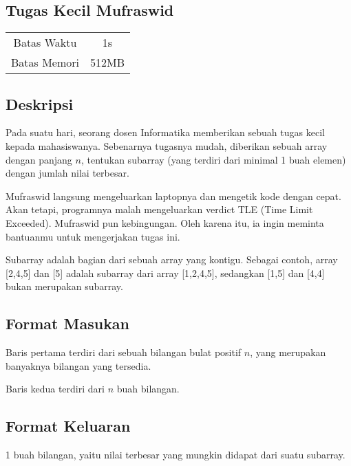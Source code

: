 \documentclass{article}
\begin{document}
\begin{center}
    \section*{Tugas Kecil Mufraswid} %

    \begin{tabular}{ | c c | }
        \hline
        Batas Waktu  & 1s \\    %
        Batas Memori & 512MB \\  %
        \hline
    \end{tabular}
\end{center}

\subsection*{Deskripsi}

Pada suatu hari, seorang dosen Informatika memberikan sebuah tugas kecil kepada mahasiswanya. Sebenarnya tugasnya mudah, diberikan sebuah array dengan panjang $n$, tentukan subarray (yang terdiri dari minimal 1 buah elemen) dengan jumlah nilai terbesar.
\par
Mufraswid langsung mengeluarkan laptopnya dan mengetik kode dengan cepat. Akan tetapi, programnya malah mengeluarkan verdict TLE (Time Limit Exceeded). Mufraswid pun kebingungan. Oleh karena itu, ia ingin meminta bantuanmu untuk mengerjakan tugas ini.
\par
Subarray adalah bagian dari sebuah array yang kontigu. Sebagai contoh, array [2,4,5] dan [5] adalah subarray dari array [1,2,4,5], sedangkan [1,5] dan [4,4] bukan merupakan subarray.

\subsection*{Format Masukan}

Baris pertama terdiri dari sebuah bilangan bulat positif $n$, yang merupakan banyaknya bilangan yang tersedia.
\par
Baris kedua terdiri dari $n$ buah bilangan.

\subsection*{Format Keluaran}

1 buah bilangan, yaitu nilai terbesar yang mungkin didapat dari suatu subarray.
\end{document}
